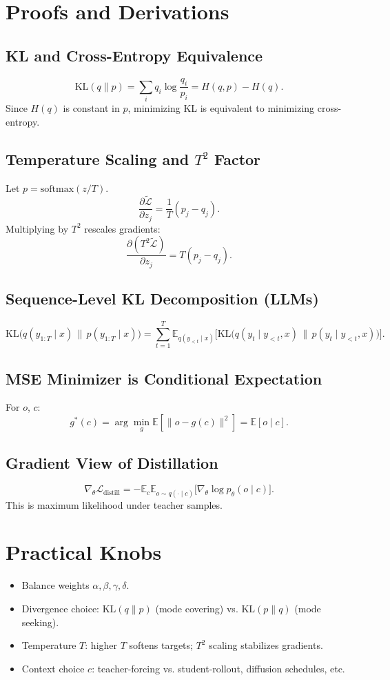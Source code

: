 \documentclass[11pt]{article}
\newcommand{\E}{\mathbb{E}}
\newcommand{\KL}{\mathrm{KL}}
\theoremstyle{remark}
\begin{document}
\section{Proofs and Derivations}
\subsection{KL and Cross-Entropy Equivalence}
\[
\KL(q\|p) = \sum_i q_i \log \frac{q_i}{p_i} = H(q,p) - H(q).
\]
Since $H(q)$ is constant in $p$, minimizing KL is equivalent to minimizing cross-entropy.

\subsection{Temperature Scaling and $T^2$ Factor}
Let $p = \text{softmax}(z/T)$.
\[
\frac{\partial \tilde{\mathcal{L}}}{\partial z_j}
= \frac{1}{T}(p_j - q_j).
\]
Multiplying by $T^2$ rescales gradients:
\[
\frac{\partial (T^2 \tilde{\mathcal{L}})}{\partial z_j}
= T(p_j - q_j).
\]

\subsection{Sequence-Level KL Decomposition (LLMs)}
\[
\KL\big(q(y_{1:T}\mid x)\,\|\,p(y_{1:T}\mid x)\big)
= \sum_{t=1}^T
\E_{q(y_{<t}\mid x)}
\Big[\KL\big(q(y_t\mid y_{<t},x)\,\|\,p(y_t\mid y_{<t},x)\big)\Big].
\]

\subsection{MSE Minimizer is Conditional Expectation}
For $o$, $c$:
\[
g^*(c) = \arg\min_g \E[\|o-g(c)\|^2] = \E[o\mid c].
\]

\subsection{Gradient View of Distillation}
\[
\nabla_\theta \mathcal{L}_{\text{distill}}
= -\E_{c}\E_{o\sim q(\cdot\mid c)}\big[\nabla_\theta \log p_\theta(o\mid c)\big].
\]
This is maximum likelihood under teacher samples.

\section{Practical Knobs}
\begin{itemize}
    \item Balance weights $\alpha,\beta,\gamma,\delta$.
    \item Divergence choice: $\KL(q\|p)$ (mode covering) vs. $\KL(p\|q)$ (mode seeking).
    \item Temperature $T$: higher $T$ softens targets; $T^2$ scaling stabilizes gradients.
    \item Context choice $c$: teacher-forcing vs. student-rollout, diffusion schedules, etc.
\end{itemize}
\end{document}
